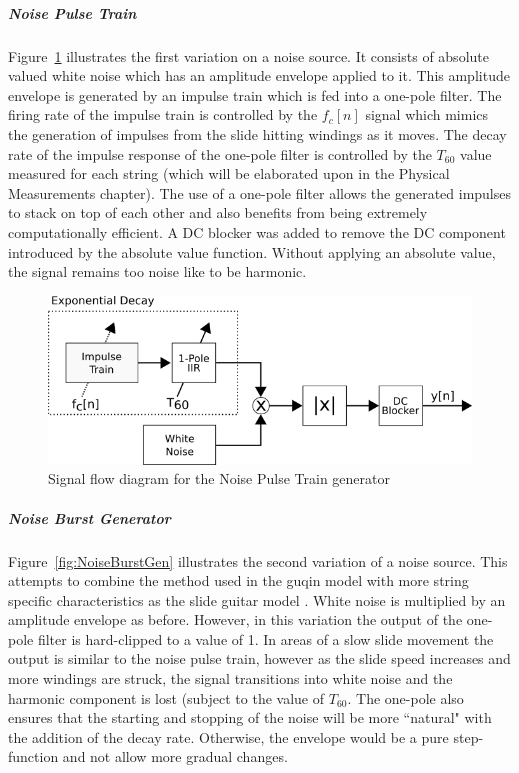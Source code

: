 \documentclass[../main.tex]{subfiles}
\begin{document}
\subparagraph{Noise Pulse Train}
Figure~\ref{fig:NoisePulseTrain} illustrates the first variation on a noise source. It consists of absolute valued white noise which has an amplitude envelope applied to it. This amplitude envelope is generated by an impulse train which is fed into a one-pole filter. The firing rate of the impulse train is controlled by the $f_c[n]$ signal which mimics the generation of impulses from the slide hitting windings as it moves. The decay rate of the impulse response of the one-pole filter is controlled by the $T_{60}$ value measured for each string (which will be elaborated upon in the Physical Measurements chapter). The use of a one-pole filter allows the generated impulses to stack on top of each other and also benefits from being extremely computationally efficient. A DC blocker was added to remove the DC component introduced by the absolute value function. Without applying an absolute value, the signal remains too noise like to be harmonic.

\begin{figure}[h]
    \centering
    \includegraphics[scale=.5]{./images/diagrams/NoisePulseTrain.png}
    \caption{Signal flow diagram for the Noise Pulse Train generator}
    \label{fig:NoisePulseTrain}
\end{figure}

\subparagraph{Noise Burst Generator}
Figure~\ref{fig:NoiseBurstGen} illustrates the second variation of a noise source. This attempts to combine the method used in the guqin model  with more string specific characteristics as the slide guitar model . White noise is multiplied by an amplitude envelope as before. However, in this variation the output of the one-pole filter is hard-clipped to a value of 1. In areas of a slow slide movement the output is similar to the noise pulse train, however as the slide speed increases and more windings are struck, the signal transitions into white noise and the harmonic component is lost (subject to the value of $T_{60}$. The one-pole also ensures that the starting and stopping of the noise will be more ``natural" with the addition of the decay rate. Otherwise, the envelope would be a pure step-function and not allow more gradual changes.
\end{document}
